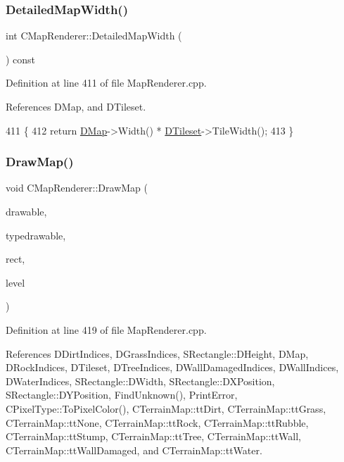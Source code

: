 \subsubsection{\texorpdfstring{Detailed\+Map\+Width()}{DetailedMapWidth()}}
{\footnotesize\ttfamily int C\+Map\+Renderer\+::\+Detailed\+Map\+Width (\begin{DoxyParamCaption}{ }\end{DoxyParamCaption}) const}



Definition at line 411 of file Map\+Renderer.\+cpp.



References D\+Map, and D\+Tileset.


\begin{DoxyCode}
411                                         \{
412     \textcolor{keywordflow}{return} \hyperlink{classCMapRenderer_ab9a199c61aa1c87a3248af3085d8ba52}{DMap}->Width() * \hyperlink{classCMapRenderer_ace0648cba050b5e02431096edd15b836}{DTileset}->TileWidth();
413 \}
\end{DoxyCode}
\hypertarget{classCMapRenderer_a26786befd5d6d0b09210736916d1b912}{}\label{classCMapRenderer_a26786befd5d6d0b09210736916d1b912} 
\subsubsection{\texorpdfstring{Draw\+Map()}{DrawMap()}}
{\footnotesize\ttfamily void C\+Map\+Renderer\+::\+Draw\+Map (\begin{DoxyParamCaption}\item[{Gdk\+Drawable $\ast$}]{drawable,  }\item[{Gdk\+Drawable $\ast$}]{typedrawable,  }\item[{const \hyperlink{structSRectangle}{S\+Rectangle} \&}]{rect,  }\item[{int}]{level }\end{DoxyParamCaption})}



Definition at line 419 of file Map\+Renderer.\+cpp.



References D\+Dirt\+Indices, D\+Grass\+Indices, S\+Rectangle\+::\+D\+Height, D\+Map, D\+Rock\+Indices, D\+Tileset, D\+Tree\+Indices, D\+Wall\+Damaged\+Indices, D\+Wall\+Indices, D\+Water\+Indices, S\+Rectangle\+::\+D\+Width, S\+Rectangle\+::\+D\+X\+Position, S\+Rectangle\+::\+D\+Y\+Position, Find\+Unknown(), Print\+Error, C\+Pixel\+Type\+::\+To\+Pixel\+Color(), C\+Terrain\+Map\+::tt\+Dirt, C\+Terrain\+Map\+::tt\+Grass, C\+Terrain\+Map\+::tt\+None, C\+Terrain\+Map\+::tt\+Rock, C\+Terrain\+Map\+::tt\+Rubble, C\+Terrain\+Map\+::tt\+Stump, C\+Terrain\+Map\+::tt\+Tree, C\+Terrain\+Map\+::tt\+Wall, C\+Terrain\+Map\+::tt\+Wall\+Damaged, and C\+Terrain\+Map\+::tt\+Water.


